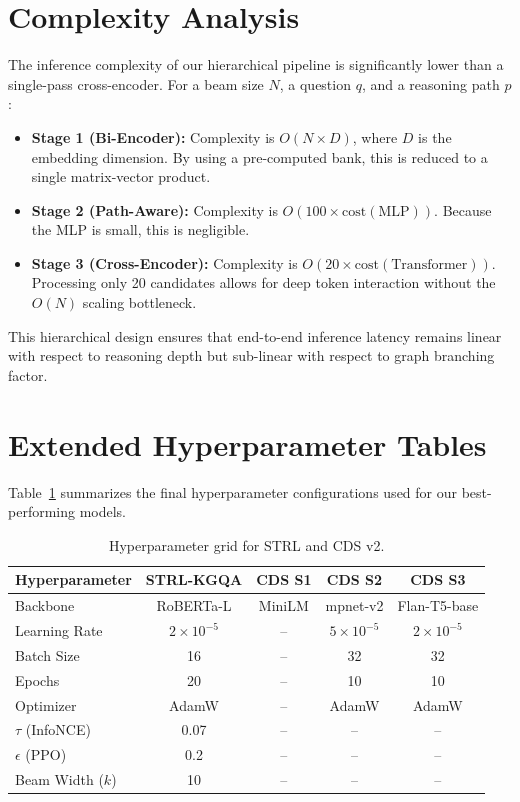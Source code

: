 \documentclass[11pt,a4paper]{article}
\newcommand{\STRL}{\textsc{STRL-KGQA}}
\begin{document}
\section{Complexity Analysis}
\label{app:complexity}
The inference complexity of our hierarchical pipeline is significantly lower
than a single-pass cross-encoder. For a beam size $N$, a question $q$, and a
reasoning path $p$:
\begin{itemize}
    \item \textbf{Stage 1 (Bi-Encoder):} Complexity is $O(N \times D)$, where $D$ is
          the embedding dimension. By using a pre-computed bank, this is
          reduced to a single matrix-vector product.
    \item \textbf{Stage 2 (Path-Aware):} Complexity is $O(100 \times \text{cost}(\text{MLP}))$.
          Because the MLP is small, this is negligible.
    \item \textbf{Stage 3 (Cross-Encoder):} Complexity is $O(20 \times \text{cost}(\text{Transformer}))$.
          Processing only 20 candidates allows for deep token interaction
          without the $O(N)$ scaling bottleneck.
\end{itemize}
This hierarchical design ensures that end-to-end inference latency remains
linear with respect to reasoning depth but sub-linear with respect to graph
branching factor.

\section{Extended Hyperparameter Tables}
\label{app:hparams}
Table~\ref{tab:hparams} summarizes the final hyperparameter configurations used
for our best-performing models.
\begin{table}[h]
\centering
\caption{Hyperparameter grid for STRL and CDS v2.}
\label{tab:hparams}
\begin{tabular}{lcccc}
\toprule
\textbf{Hyperparameter} & \textbf{\STRL{}} & \textbf{CDS S1} & \textbf{CDS S2} & \textbf{CDS S3} \\
\midrule
Backbone           & RoBERTa-L & MiniLM & mpnet-v2 & Flan-T5-base \\
Learning Rate      & $2\times10^{-5}$ & -- & $5\times10^{-5}$ & $2\times10^{-5}$ \\
Batch Size         & 16 & -- & 32 & 32 \\
Epochs             & 20 & -- & 10 & 10 \\
Optimizer          & AdamW & -- & AdamW & AdamW \\
$\tau$ (InfoNCE)   & 0.07 & -- & -- & -- \\
$\epsilon$ (PPO)   & 0.2  & -- & -- & -- \\
Beam Width ($k$)   & 10   & -- & -- & -- \\
\bottomrule
\end{tabular}
\end{table}
\end{document}
